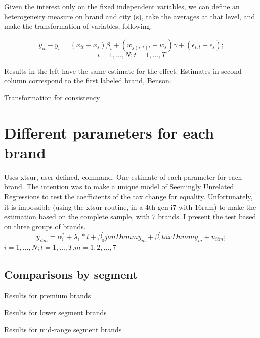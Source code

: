 \documentclass[]{article}
\begin{document}
Given the interest only on the fixed independent variables, we can define an heterogeneity measure on brand and city (s), take the averages at that level, and make the transformation of variables, following:
 
\begin{equation*}
y_{it} - \bar{y_s} = (x_{it} - \bar{x_{s}}) \beta_{i} + (w_{j(i,t)t}-\bar{w_{s}}) \gamma + (\epsilon_{i,t} - \bar{\epsilon_{s}}); 
\end{equation*}
$$i = 1,\ldots,N; t=1,\ldots,T$$
 
Results in the left have the same estimate for the effect. Estimates in second column correspond to the first labeled brand, Benson.
 
	\begin{table}[ht]
		\centering
		\caption{Transformation for consistency \label{tab:xtDm}} 

	\end{table}



\section{Different parameters for each brand}
Uses xtsur, user-defined, command.
One estimate of each parameter for each brand. 
The intention was to make a unique model of Seemingly Unrelated Regressions to test the coefficients of the tax change for equality. 
Unfortunately, it is impossible (using the xtsur routine, in a 4th gen i7 with 16ram) to make the estimation based on the complete sample, with 7 brands. I present the test based on three groups of brands.
\begin{equation*} 
	y_{itm}  = \alpha_{i}^{*} + \lambda_{1}*t +\beta_{0}^{'}janDummy_{m} + \beta_{1}^{'}taxDummy_{m} + u_{itm}
	;  
\end{equation*}
$i  = 1,\ldots,N;  t=1,\ldots,T. m = 1,2,\ldots,7$

\subsection{Comparisons by segment}
Results for premium brands



Results for lower segment brands



Results for mid-range segment brands


\end{document}
